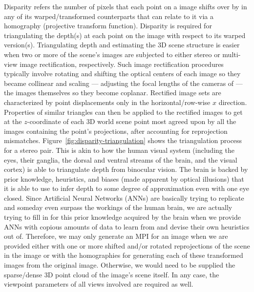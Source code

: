 Disparity refers the number of pixels that each point on a image shifts over by in any of its warped/transformed counterparts that can relate to it via a homography (projective transform function). Disparity is required for triangulating the depth(s) at each point on the image with respect to its warped version(s). Triangulating depth and estimating the 3D scene structure is easier when two or more of the scene's images are subjected to either stereo or multi-view image rectification, respectively. Such image rectification procedures typically involve rotating and shifting the optical centers of each image so they became collinear and scaling --- adjusting the focal lengths of the cameras of --- the images themselves so they become coplanar. Rectified image sets are characterized by point displacements only in the horizontal/row-wise $x$ direction. Properties of similar triangles can then be applied to the rectified images to get at the $z$-coordinate of each 3D world scene point most agreed upon by all the images containing the point's projections, after accounting for reprojection mismatches. Figure~\ref{fig:disparity-triangulation} shows the triangulation process for a stereo pair. This is akin to how the human visual system (including the eyes, their ganglia, the dorsal and ventral streams of the brain, and the visual cortex) is able to triangulate depth from binocular vision. The brain is backed by prior knowledge, heuristics, and biases (made apparent by optical illusions) that it is able to use to infer depth to some degree of approximation even with one eye closed. Since Artificial Neural Networks (ANNs) are basically trying to replicate and someday even surpass the workings of the human brain, we are actually trying to fill in for this prior knowledge acquired by the brain when we provide ANNs with copious amounts of data to learn from and devise their own heuristics out of. Therefore, we may only generate an MPI for an image when we are provided either with one or more shifted and/or rotated reprojections of the scene in the image or with the homographies for generating each of these transformed images from the original image. Otherwise, we would need to be supplied the sparse/dense 3D point cloud of the image's scene itself. In any case, the viewpoint parameters of all views involved are required as well.


